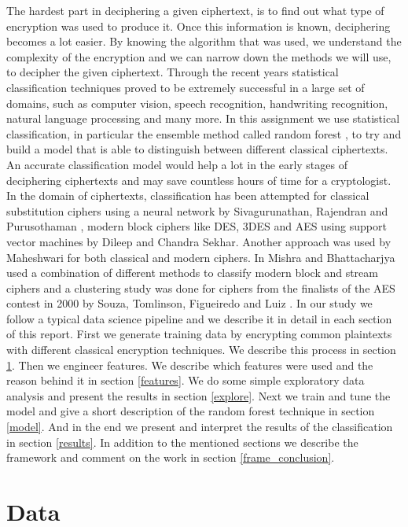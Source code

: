 \documentclass[a4paper]{article}
\begin{document}
The hardest part in deciphering a given ciphertext, is to find out what type of encryption was used to produce it. Once this information is known, deciphering becomes a lot easier. By knowing the algorithm that was used, we understand the complexity of the encryption and we can narrow down the methods we will use, to decipher the given ciphertext. Through the recent years statistical classification techniques proved to be extremely successful in a large set of domains, such as computer vision, speech recognition, handwriting recognition, natural language processing and many more. In this assignment we use statistical classification, in particular the ensemble method called random forest \cite{breiman2001random}, to try and build a model that is able to distinguish between different classical ciphertexts. An accurate classification model would help a lot in the early stages of deciphering ciphertexts and may save countless hours of time for a cryptologist. In the domain of ciphertexts, classification has been attempted for classical substitution ciphers using a neural network by Sivagurunathan, Rajendran and Purusothaman \cite{sivagurunathan2010classification}, modern block ciphers like DES, 3DES and AES using support vector machines by Dileep and Chandra Sekhar\cite{dileep2006identification}. Another approach was used by Maheshwari \cite{maheshwari2001classification} for both classical and modern ciphers. In \cite{mishra2013pattern} Mishra and Bhattacharjya used a combination of different methods to classify modern block and stream ciphers and a clustering study was done for ciphers from the finalists of the AES contest in 2000 by Souza, Tomlinson, Figueiredo and Luiz \cite{decipher}. In our study we follow a typical data science pipeline and we describe it in detail in each section of this report. First we generate training data by encrypting common plaintexts with different classical encryption techniques. We describe this process in section \ref{data}. Then we engineer features. We describe which features were used and the reason behind it in section \ref{features}. We do some simple exploratory data analysis and present the results in section \ref{explore}. Next we train and tune the model and give a short description of the random forest technique in section \ref{model}. And in the end we present and interpret the results of the classification in section \ref {results}. In addition to the mentioned sections we describe the framework and comment on the work in section \ref{frame_conclusion}.

\section{Data} \label{data}
\end{document}

